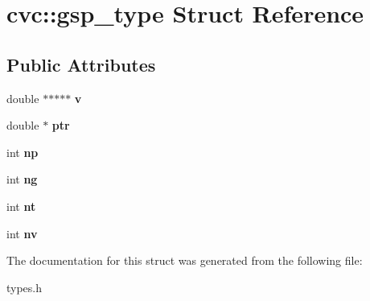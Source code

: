 \hypertarget{structcvc_1_1gsp__type}{\section{cvc\-:\-:gsp\-\_\-type Struct Reference}
\label{structcvc_1_1gsp__type}
}
\subsection*{Public Attributes}
\begin{DoxyCompactItemize}
\item 
\hypertarget{structcvc_1_1gsp__type_aab41d9aa5d9ab3d782881fadd0cb7a56}{double $\ast$$\ast$$\ast$$\ast$$\ast$ {\bfseries v}}\label{structcvc_1_1gsp__type_aab41d9aa5d9ab3d782881fadd0cb7a56}

\item 
\hypertarget{structcvc_1_1gsp__type_a77ca4b5a0c38864c0704b0bbe4711554}{double $\ast$ {\bfseries ptr}}\label{structcvc_1_1gsp__type_a77ca4b5a0c38864c0704b0bbe4711554}

\item 
\hypertarget{structcvc_1_1gsp__type_a33a9bce05cf007a1e27d23be6ab5089f}{int {\bfseries np}}\label{structcvc_1_1gsp__type_a33a9bce05cf007a1e27d23be6ab5089f}

\item 
\hypertarget{structcvc_1_1gsp__type_afb6b3b3ec0ff8073797863369cf18861}{int {\bfseries ng}}\label{structcvc_1_1gsp__type_afb6b3b3ec0ff8073797863369cf18861}

\item 
\hypertarget{structcvc_1_1gsp__type_a644abaadb0e639d7004922e309f5b6c7}{int {\bfseries nt}}\label{structcvc_1_1gsp__type_a644abaadb0e639d7004922e309f5b6c7}

\item 
\hypertarget{structcvc_1_1gsp__type_a4edd62bc7ad5806297fc203b613d2f30}{int {\bfseries nv}}\label{structcvc_1_1gsp__type_a4edd62bc7ad5806297fc203b613d2f30}

\end{DoxyCompactItemize}


The documentation for this struct was generated from the following file\-:\begin{DoxyCompactItemize}
\item 
types.\-h\end{DoxyCompactItemize}
